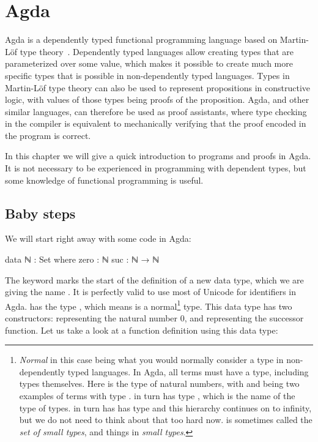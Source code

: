 
\chapter{Agda} \label{Agda}

	Agda is a dependently typed functional programming language based on
	Martin-Löf type theory~\cite{martin84}. Dependently typed languages allow
	creating types that are parameterized over some value, which makes it
	possible to create much more specific types that is possible in
	non-dependently typed languages. Types in Martin-Löf type theory can also
	be used to represent propositions in constructive logic, with values of
	those types being proofs of the proposition. Agda, and other similar
	languages, can therefore be used as proof assistants, where type checking
	in the compiler is equivalent to mechanically verifying that the proof
	encoded in the program is correct.

	In this chapter we will give a quick introduction to programs and proofs in
	Agda. It is not necessary to be experienced in programming with dependent
	types, but some knowledge of functional programming is useful.

	\section{Baby steps}

		We will start right away with some code in Agda:

		\begin{code}
			data ℕ : Set where
			  zero  :  ℕ
			  suc   :  ℕ → ℕ
		\end{code}

		The keyword  marks the start of the definition of a new
		data type, which we are giving the name . It is perfectly
		valid to use most of Unicode for identifiers in Agda.  has
		the type , which means  is a normal\footnote{
		\emph{Normal} in this case being what you would normally consider a
		type in non-dependently typed languages. In Agda, all terms must have a
		type, including types themselves. Here  is the type of
		natural numbers, with  and  being
		two examples of terms with type .  in turn has type
		, which is the name of the type of types.   in
		turn has has type  and this hierarchy continues on to
		infinity, but we do not need to think about that too hard now.
		 is sometimes called the \emph{set of small types}, and
		things in  \emph{small types}.} type. This data type has two
		constructors:  representing the natural number $0$, and
		 representing the successor function. Let us take a look at
		a function definition using this data type:

